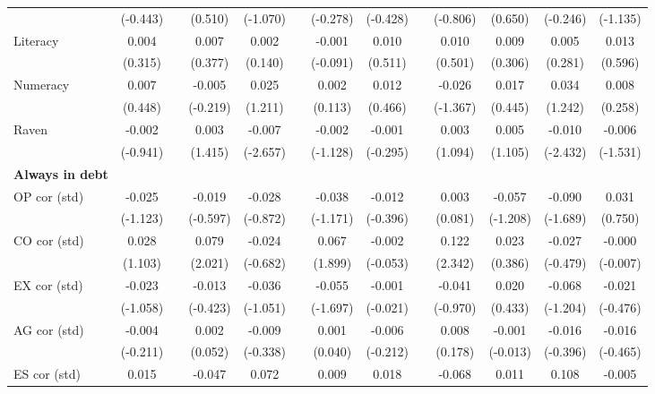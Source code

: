 \begin{table}[htbp]
{\begin{tabular}{lcccccccccccc}
      & (-0.443) &   & (0.510) & (-1.070) &   & (-0.278) & (-0.428) &   & (-0.806) & (0.650) & (-0.246) & (-1.135) \\
    Literacy & 0.004 &   & 0.007 & 0.002 &   & -0.001 & 0.010 &   & 0.010 & 0.009 & 0.005 & 0.013 \\
      & (0.315) &   & (0.377) & (0.140) &   & (-0.091) & (0.511) &   & (0.501) & (0.306) & (0.281) & (0.596) \\
    Numeracy & 0.007 &   & -0.005 & 0.025 &   & 0.002 & 0.012 &   & -0.026 & 0.017 & 0.034 & 0.008 \\
      & (0.448) &   & (-0.219) & (1.211) &   & (0.113) & (0.466) &   & (-1.367) & (0.445) & (1.242) & (0.258) \\
    Raven & -0.002 &   & 0.003 & \cellcolor[rgb]{ 1,  1,  0}-0.007 &   & -0.002 & -0.001 &   & 0.003 & 0.005 & \cellcolor[rgb]{ 1,  1,  0}-0.010 & -0.006 \\
      & (-0.941) &   & (1.415) & (-2.657) &   & (-1.128) & (-0.295) &   & (1.094) & (1.105) & (-2.432) & (-1.531) \\
    \midrule
    \textbf{Always in debt} &   &   &   &   &   &   &   &   &   &   &   &  \\
    OP cor (std) & -0.025 &   & -0.019 & -0.028 &   & -0.038 & -0.012 &   & 0.003 & -0.057 & \cellcolor[rgb]{ 1,  1,  0}-0.090 & 0.031 \\
      & (-1.123) &   & (-0.597) & (-0.872) &   & (-1.171) & (-0.396) &   & (0.081) & (-1.208) & (-1.689) & (0.750) \\
    CO cor (std) & 0.028 &   & \cellcolor[rgb]{ 1,  1,  0}0.079 & -0.024 &   & \cellcolor[rgb]{ 1,  1,  0}0.067 & -0.002 &   & \cellcolor[rgb]{ 1,  1,  0}0.122 & 0.023 & -0.027 & -0.000 \\
      & (1.103) &   & (2.021) & (-0.682) &   & (1.899) & (-0.053) &   & (2.342) & (0.386) & (-0.479) & (-0.007) \\
    EX cor (std) & -0.023 &   & -0.013 & -0.036 &   & \cellcolor[rgb]{ 1,  1,  0}-0.055 & -0.001 &   & -0.041 & 0.020 & -0.068 & -0.021 \\
      & (-1.058) &   & (-0.423) & (-1.051) &   & (-1.697) & (-0.021) &   & (-0.970) & (0.433) & (-1.204) & (-0.476) \\
    AG cor (std) & -0.004 &   & 0.002 & -0.009 &   & 0.001 & -0.006 &   & 0.008 & -0.001 & -0.016 & -0.016 \\
      & (-0.211) &   & (0.052) & (-0.338) &   & (0.040) & (-0.212) &   & (0.178) & (-0.013) & (-0.396) & (-0.465) \\
    ES cor (std) & 0.015 &   & -0.047 & \cellcolor[rgb]{ 1,  1,  0}0.072 &   & 0.009 & 0.018 &   & -0.068 & 0.011 & \cellcolor[rgb]{ 1,  1,  0}0.108 & -0.005 \\

\end{tabular}}
\end{table}
